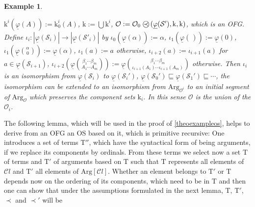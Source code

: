 \documentclass[10pt]{article}
\newtheorem {example}[lemma]{Example}
\def\ar{\rightarrow}
\def \calO{{\mathcal O}}
\def \calS{{\mathcal S}}
\def\Arg{\mathrm{Arg}}
\def\k{\mathrm{k}}
\def\Cl{{\mathcal{C}l}}
\def\phibar{{\underline{\varphi}}}
\def\preccirc{\mathrel{\bigcirc \kern-12pt \prec}} %
\def\T{\mathrm{T}}
\def \segment{\sqsubseteq}
\begin{document}
\begin{example}
{\begin{enumerate}
$\k^i(\phibar(A)):= \k^i_0(A)$,
$\k:= \bigcup \k^i$,
$\calO:= \calO_0 \preccirc (\phibar(\calS'),\k,\k)$, which is an OFG.\\
Define $\iota_i:|\phibar(\calS_i)| \ar |\phibar(\calS'_i)|$ by
$\iota_0(\phibar(\alpha)):= \alpha$,
$\iota_1(\phibar{\choose}):= \phibar(0)$,
$\iota_1(\phibar{\alpha \choose 0}):= \phibar(\alpha)$,
$\iota_1(a):= a$ otherwise,
$\iota_{i+2}(a):= \iota_{i+1}(a)$ for $a \in \phibar(\calS_{i+1})$,
$\iota_{i+2}(\phibar{\beta_1 \cdots \beta_m \choose A_1 \cdots A_m}):=
\phibar{\beta_1 \cdots \beta_m \choose \iota_{i+1} (A_1)\cdots\iota_{i+1} (A_m)}$
otherwise.
Then $\iota_i$ is an isomorphism from $\phibar(\calS_i)$ to 
$\phibar(\calS_i')$, 
$\phibar(\calS_0') \segment \phibar(\calS_1') \segment \cdots$, the
isomorphism can be extended to an 
isomorphism from $\Arg_{\calO^i}$ to an initial segment of
$\Arg_{\calO}$ which preserves the component sets $\k_i$.
In this sense $\calO$ is the union of the $\calO_i$.
\end{enumerate}}
\end{example}
%
The following lemma, which will be used in the proof
of \ref{theoexampleos}, helps to derive from an OFG an OS based on 
it, which is primitive recursive: One introduces a set of terms $\T''$,
which have the syntactical form of being arguments, if we replace
its components by ordinals. From these terms we select now a set
$\T$ of terms and $\T'$ of arguments based on $\T$ such that
$\T$ represents all elements of $\Cl$ and $\T'$ all elements
of $\Arg[\Cl]$. Whether an element belongs to $\T'$ or
$\T$ depends now on the ordering of its components, which
need to be in $\T$ and then one can show that under the assumptions formulated
in the next lemma, $\T$, $\T'$, $\prec$ and $\prec'$  will be 
\end{document}
